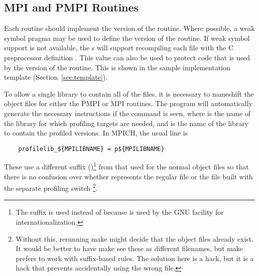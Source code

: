 \documentclass{article}
\begin{document}
\subsection{MPI and PMPI Routines}
\label{sec:pmpi-routines}
Each routine should implement the  version of the routine.
Where possible, a weak symbol pragma may be used to define the
 version of the routine.  If weak symbol support is not
available, the s will support recompiling each file
with the C preprocessor definition .  This value
can also be used to protect code that is used by the 
version of the routine.  This is shown in the sample implementation template
(Section~\ref{sec:template}).

To allow a single library to contain all of the files, it is necessary to
nameshift the object files for either the PMPI or MPI routines.  
The  program will automatically generate the
necessary instructions if the command  is
seen, where  is the name of the library for which profiling
targets are needed, and  is the name of the library to
contain the profiled versions.  In MPICH, the usual line is
\begin{verbatim}
    profilelib_${MPILIBNAME} = p${MPILIBNAME}
\end{verbatim}
These use a different suffix ()\footnote{The suffix 
is used instead of  
because  is used by the GNU  facility for
internationalization.}
from that used
for the normal object files so that there is no confusion over whether
 represents the regular file or the file built with the separate
profiling switch \footnote{Without this, rerunning
  make might decide that the object files already exist.  It would be better
  to have make see these as different filenames, but make prefers to work with
  suffix-based rules.  The solution here is a hack, but it is a hack that
  prevents accidentally using the wrong file.}.
\end{document}
